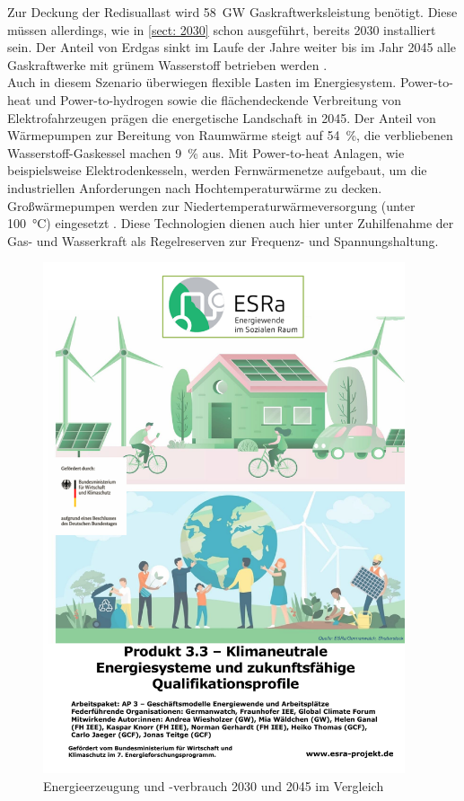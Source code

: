 		Zur Deckung der Redisuallast wird \SI{58}{\giga\watt} Gaskraftwerksleistung benötigt.
		Diese müssen allerdings, wie in \ref{sect: 2030} schon ausgeführt, bereits 2030 installiert sein. 
		Der Anteil von Erdgas sinkt im Laufe der Jahre weiter bis im Jahr 2045 alle Gaskraftwerke mit grünem Wasserstoff betrieben werden \cite[S.8]{ESRa_Fraunhofer}. \\
		
		Auch in diesem Szenario überwiegen flexible Lasten im Energiesystem. 
		Power-to-heat und Power-to-hydrogen sowie die flächendeckende Verbreitung von Elektrofahrzeugen prägen die energetische Landschaft in 2045.
		Der Anteil von Wärmepumpen zur Bereitung von Raumwärme steigt auf \SI{54}{\percent}, die verbliebenen Wasserstoff-Gaskessel machen \SI{9}{\percent} aus. 
		Mit Power-to-heat Anlagen, wie beispielsweise Elektrodenkesseln, werden Fernwärmenetze aufgebaut, um die industriellen Anforderungen nach Hochtemperaturwärme zu decken.
		Großwärmepumpen werden zur Niedertemperaturwärmeversorgung (unter \SI{100}{\degreeCelsius}) eingesetzt \cite[S.10ff]{ESRa_Fraunhofer}.
		Diese Technologien dienen auch hier unter Zuhilfenahme der Gas- und Wasserkraft als Regelreserven zur Frequenz- und Spannungshaltung.
		
		\begin{figure} [H]
			\centering
			\label{Abb. Energiesystem 2045} 
			\includegraphics[page=17,trim=45 210 45 90, clip, width=0.95\textwidth]{./anhang/Frauenhofer Studie.pdf}
			\caption{Energieerzeugung und -verbrauch 2030 und 2045 im Vergleich \cite[S.9]{ESRa_Fraunhofer}}
		\end{figure}
		

